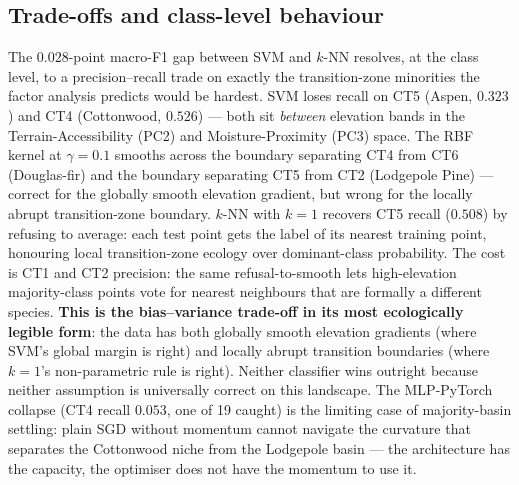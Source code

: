\documentclass[conference]{IEEEtran}
\begin{document}
\subsection{Trade-offs and class-level behaviour}\label{sec:disc:tradeoff}
The $0.028$-point macro-F1 gap between SVM and $k$-NN resolves, at the class
level, to a precision--recall trade on exactly the transition-zone minorities
the factor analysis predicts would be hardest.
SVM loses recall on CT5 (Aspen, $0.323$) and CT4 (Cottonwood, $0.526$) ---
both sit \emph{between} elevation bands in the Terrain-Accessibility (PC2)
and Moisture-Proximity (PC3) space.
The RBF kernel at $\gamma{=}0.1$ smooths across the boundary separating CT4
from CT6 (Douglas-fir) and the boundary separating CT5 from CT2 (Lodgepole
Pine) --- correct for the globally smooth elevation gradient, but wrong
for the locally abrupt transition-zone boundary.
$k$-NN with $k{=}1$ recovers CT5 recall ($0.508$) by refusing to average:
each test point gets the label of its nearest training point, honouring local
transition-zone ecology over dominant-class probability.
The cost is CT1 and CT2 precision: the same refusal-to-smooth lets
high-elevation majority-class points vote for nearest neighbours that are
formally a different species.
\textbf{This is the bias--variance trade-off in its most ecologically legible
form}: the data has both globally smooth elevation gradients (where SVM's
global margin is right) and locally abrupt transition boundaries (where
$k{=}1$'s non-parametric rule is right).
Neither classifier wins outright because neither assumption is universally
correct on this landscape.
The MLP-PyTorch collapse (CT4 recall $0.053$, one of 19 caught) is the
limiting case of majority-basin settling: plain SGD without momentum cannot
navigate the curvature that separates the Cottonwood niche from the Lodgepole
basin --- the architecture has the capacity, the optimiser does not have the
momentum to use it.
\end{document}

